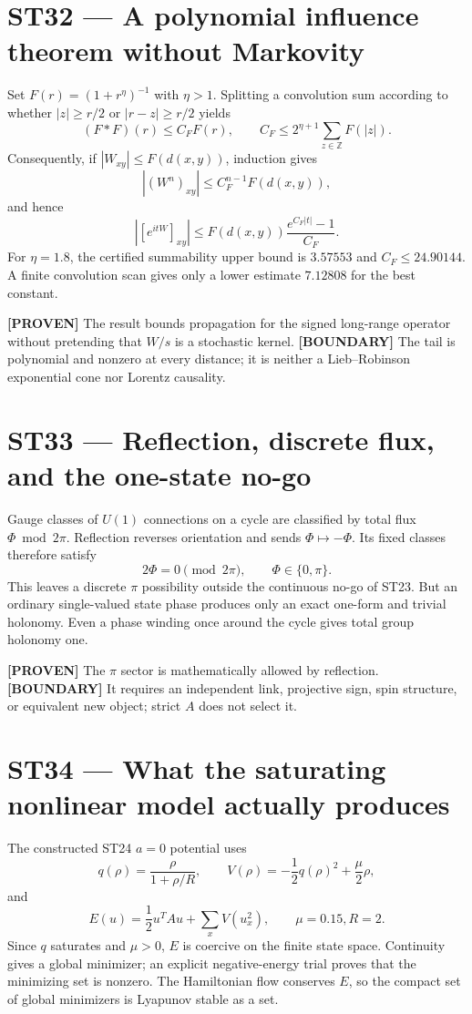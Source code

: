 \documentclass[11pt,a4paper]{article}
\newcommand{\proven}{\textcolor{green!40!black}{\textbf{[PROVEN]}}}
\newcommand{\statusboundary}{\textcolor{orange!80!black}{\textbf{[BOUNDARY]}}}
\begin{document}
\section{ST32 --- A polynomial influence theorem without Markovity}

Set $F(r)=(1+r^\eta)^{-1}$ with $\eta>1$. Splitting a convolution sum according to whether $|z|\ge r/2$ or $|r-z|\ge r/2$ yields
\[
(F*F)(r)\le C_FF(r),\qquad
C_F\le2^{\eta+1}\sum_{z\in\mathbb Z}F(|z|).
\]
Consequently, if $|W_{xy}|\le F(d(x,y))$, induction gives
\[
|(W^n)_{xy}|\le C_F^{n-1}F(d(x,y)),
\]
and hence
\[
|[e^{itW}]_{xy}|\le F(d(x,y))\frac{e^{C_F|t|}-1}{C_F}.
\]
For $\eta=1.8$, the certified summability upper bound is $3.57553$ and $C_F\le24.90144$. A finite convolution scan gives only a lower estimate $7.12808$ for the best constant.

\proven{} The result bounds propagation for the signed long-range operator without pretending that $W/s$ is a stochastic kernel. \statusboundary{} The tail is polynomial and nonzero at every distance; it is neither a Lieb--Robinson exponential cone nor Lorentz causality.

\section{ST33 --- Reflection, discrete flux, and the one-state no-go}

Gauge classes of $U(1)$ connections on a cycle are classified by total flux $\Phi\bmod2\pi$. Reflection reverses orientation and sends $\Phi\mapsto-\Phi$. Its fixed classes therefore satisfy
\[
2\Phi=0\pmod{2\pi},\qquad \Phi\in\{0,\pi\}.
\]
This leaves a discrete $\pi$ possibility outside the continuous no-go of ST23. But an ordinary single-valued state phase produces only an exact one-form and trivial holonomy. Even a phase winding once around the cycle gives total group holonomy one.

\proven{} The $\pi$ sector is mathematically allowed by reflection. \statusboundary{} It requires an independent link, projective sign, spin structure, or equivalent new object; strict $A$ does not select it.

\section{ST34 --- What the saturating nonlinear model actually produces}

The constructed ST24 $a=0$ potential uses
\[
q(\rho)=\frac{\rho}{1+\rho/R},\qquad
V(\rho)=-\frac12q(\rho)^2+\frac\mu2\rho,
\]
and
\[
E(u)=\frac12u^TAu+\sum_xV(u_x^2),\qquad \mu=0.15, R=2.
\]
Since $q$ saturates and $\mu>0$, $E$ is coercive on the finite state space. Continuity gives a global minimizer; an explicit negative-energy trial proves that the minimizing set is nonzero. The Hamiltonian flow conserves $E$, so the compact set of global minimizers is Lyapunov stable as a set.
\end{document}
